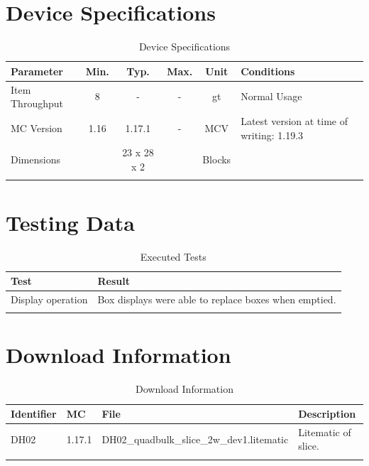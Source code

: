 \documentclass[10pt]{datasheet}
\begin{document}
\onecolumn

\section{Device Specifications}

\begin{table}[h]
    \caption{Device Specifications}
    \begin{tabularx}{\textwidth}{l | c c c | c | X}
        \thickhline
        \textbf{Parameter} & \textbf{Min.} & \textbf{Typ.} & \textbf{Max.} &
        \textbf{Unit} & \textbf{Conditions} \\
        \hline
        Item Throughput  & 8 & - & - & gt & Normal Usage \\
        \hline
        MC Version & 1.16 & 1.17.1 & - & MCV & Latest version at time of writing: 1.19.3\\
        \hline
        Dimensions & & 23 x 28 x 2 & & Blocks & \\
        \thickhline
\end{tabularx}
\end{table}
\newpage
\section{Testing Data}
\begin{table}[h]
\caption{Executed Tests}
\begin{tabularx}{\textwidth}{l | X}
    \thickhline
    \textbf{Test} & \textbf{Result} \\
    \hline
    Display operation & Box displays were able to replace boxes when emptied. \\
    \thickhline
\end{tabularx}
\end{table}

\section{Download Information}
\begin{table}[h]
    \caption{Download Information}
    \begin{tabularx}{\textwidth}{l | l | l | X}
        \thickhline
        \textbf{Identifier} & \textbf{MC} & \textbf{File} & \textbf{Description} \\
        \hline
        DH02 & 1.17.1 & DH02\_quadbulk\_slice\_2w\_dev1.litematic & Litematic of slice. \\
        \hline
        \thickhline
    \end{tabularx}
\end{table}
\end{document}
